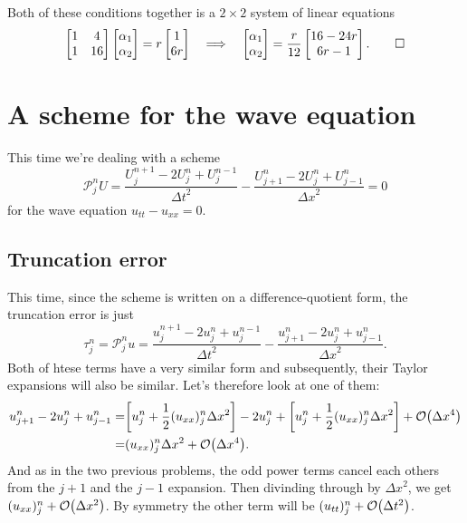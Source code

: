 \documentclass[11pt,letter, swedish, english
]{article}
\newcommand{\Dx}{\ensuremath{\Delta{x}}}
\newcommand{\Dt}{\ensuremath{\Delta{t}}}
\begin{document}
Both of these conditions together is a $2\times2$ system of linear
equations 
\begin{equation}
\begin{bmatrix}1&4\\1&16\end{bmatrix}
\begin{bmatrix}\alpha_1\\\alpha_2\end{bmatrix}
=r\begin{bmatrix}1\\6r\end{bmatrix}
\quad\Longrightarrow\quad
\begin{bmatrix}\alpha_1\\\alpha_2\end{bmatrix}
=\frac{r}{12}\begin{bmatrix*}[c]
16-24r\\6r-1
\end{bmatrix*}.
\qed
\end{equation}


\section{A scheme for the wave equation}
This time we're dealing with a scheme
\begin{equation}\label{eq:3_start}
\mathcal{P}_j^nU=\frac{U_j^{n+1}-2U_j^{n}+U_j^{n-1}}{\Dt^2}
-\frac{U_{j+1}^{n}-2U_j^{n}+U_{j-1}^{n}}{\Dx^2}=0
\end{equation}
for the wave equation $u_{tt}-u_{xx}=0$.

\subsection{Truncation error}
This time, since the scheme is written on a difference-quotient form,
the truncation error is just
\begin{equation}
\tau_j^n=\mathcal{P}_j^nu
=\frac{u_j^{n+1}-2u_j^{n}+u_j^{n-1}}{\Dt^2}
-\frac{u_{j+1}^{n}-2u_j^{n}+u_{j-1}^{n}}{\Dx^2}.
\end{equation}
Both of htese terms have a very similar form and subsequently, their
Taylor expansions will also be similar. Let's therefore look at one of
them:
\begin{equation}
\begin{aligned}
u_{j+1}^{n}-2u_j^{n}+u_{j-1}^{n}=&
\qty[u_j^n+\frac{1}{2}(u_{xx})_j^n\Dx^2]-2u_j^n
+\qty[u_j^n+\frac{1}{2}(u_{xx})_j^n\Dx^2]+\order{\Dx^4}\\
=&(u_{xx})_j^n\Dx^2+\order{\Dx^4}.
\end{aligned}
\end{equation}
And as in the two previous problems, the odd power terms cancel each
others from the $j+1$ and the $j-1$ expansion. Then divinding through
by $\Dx^2$, we get $(u_{xx})_j^n+\order{\Dx^2}$.
By symmetry the other term will be $(u_{tt})_j^n+\order{\Dt^2}$.
\end{document}
